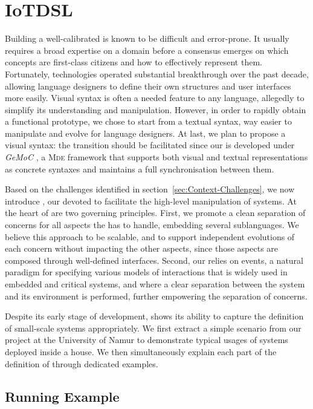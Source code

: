 \section{IoTDSL}
\label{sec:IoTDSL}

Building a well-calibrated \DSL is known to be difficult and error-prone. It usually requires a broad expertise on a domain before a consensus emerges on which concepts are first-class citizens and how to effectively represent them. Fortunately, \MDE technologies operated substantial breakthrough over the past decade, allowing language designers to define their own \DSL structures and user interfaces more easily. Visual syntax is often a needed feature to any language, allegedly to simplify its understanding and manipulation. However, in order to rapidly obtain a functional prototype, we chose to start from a textual syntax, way easier to manipulate and evolve for language designers. At last, we plan to propose a visual syntax: the transition should be facilitated since our \DSL is developed under \textit{GeMoC} \cite{bousse-16}, a \textsc{Mde} framework that supports both visual and textual representations as concrete syntaxes and maintains a full synchronisation between them.

Based on the challenges identified in section~\ref{sec:Context-Challenges}, we now introduce \IOTDSL, our \DSL devoted to facilitate the high-level manipulation of \IOT systems. At the heart of \IOTDSL are two governing principles. First, we promote a clean separation of concerns for all aspects the \DSL has to handle, embedding several sublanguages. We believe this approach to be scalable, and to support independent evolutions of each concern without impacting the other aspects, since those aspects are composed through well-defined interfaces. Second, our \DSL relies on events, a natural paradigm for specifying various models of interactions that is widely used in embedded and critical systems, and where a clear separation between the system and its environment is performed, further empowering the separation of concerns.

Despite its early stage of development, \IOTDSL shows its ability to capture the definition of small-scale \IOT systems appropriately. We first extract a simple scenario from our project at the University of Namur to demonstrate typical usages of \IOT systems deployed inside a house. We then simultaneously explain each part of the definition of \IOTDSL through dedicated examples.


\subsection{Running Example}
\label{sec:IoTDSL-Example}

